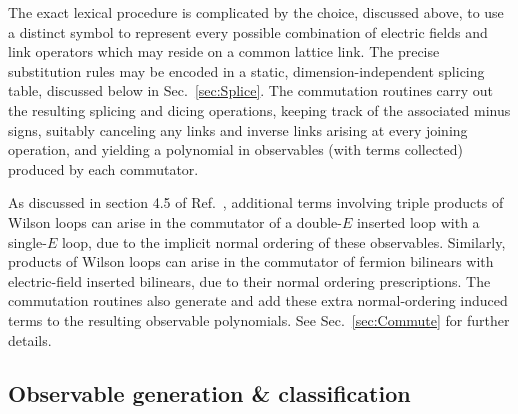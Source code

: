 \documentclass [12pt]{article}
\begin{document}
The exact lexical procedure is complicated by the choice,
discussed above, to use a distinct symbol to represent
every possible combination of electric fields and link
operators which may reside on a common lattice link.
The precise substitution rules may be encoded
in a static, dimension-independent splicing table,
discussed below in Sec.~\ref{sec:Splice}.
The commutation routines
carry out the resulting splicing and dicing operations,
keeping track of the associated minus signs,
suitably canceling any links and inverse links
arising at every joining operation, and yielding
a polynomial in observables (with terms collected)
produced by each commutator.

As discussed in section 4.5 of Ref.~\cite{CSVAII}, additional
terms involving triple products of Wilson loops can arise
in the commutator of a double-$E$ inserted loop with
a single-$E$ loop, due to the implicit normal ordering
of these observables.
Similarly, products of Wilson loops can arise in the
commutator of fermion bilinears with electric-field inserted
bilinears, due to their normal ordering prescriptions.
The commutation routines also generate and
add these extra normal-ordering induced terms
to the resulting observable polynomials.
See Sec.~\ref{sec:Commute} for further details.

\subsection {Observable generation \& classification}
\end{document}
